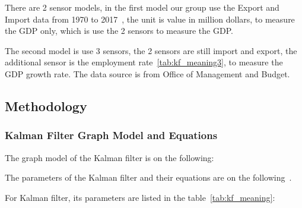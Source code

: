 \documentclass[11pt, a4paper]{article}
\begin{document}
There are 2 sensor models, in the first model our group use the Export and Import data from 1970 to 2017~\cite{ref:source2}, the unit is value in million dollars, to measure the GDP only, which is use the 2 sensors to measure the GDP. 

The second model is use 3 sensors, the 2 sensors are still import and export, the additional sensor is the employment rate~\ref{tab:kf_meaning3}, to measure the GDP growth rate. The data source is from Office of Management and Budget. 

\subsection{Methodology}

\subsubsection{Kalman Filter Graph Model and Equations}
The graph model of the Kalman filter is on the following:



The parameters of the Kalman filter and their equations are on the following~\cite{ref:kf}.

For Kalman filter, its parameters are listed in the table~\ref{tab:kf_meaning}:
\end{document}
